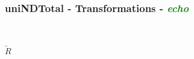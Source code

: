 \documentclass{beamer}
\begin{document}
\begin{frame}
\frametitle{uniNDTotal - \textbf{Transformations} - \textbf{\textit{\textcolor{green}{echo}}}}
\begin{figure}[ht]
\begin{mdframed}
    \centering
    \mbox{\qquad\qquad\qquad
          }
\end{mdframed}          
    \label{fig:T1}
\end{figure}

\begin{center}
$\overleftarrow{R}$
\end{center}

\begin{figure}[ht]
    \centering
    \mbox{
          }
    \label{fig:T2}
\end{figure}

\end{frame}
\end{document}

